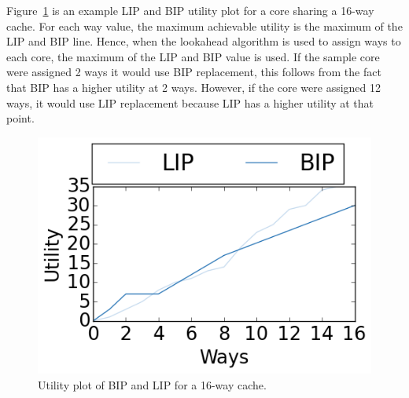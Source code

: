 Figure~\ref{fig:algorithms:clu_example} is an example LIP and BIP utility plot for a core sharing a 16-way cache.
For each way value, the maximum achievable utility is the maximum of the LIP and BIP line.
Hence, when the lookahead algorithm is used to assign ways to each core, the maximum of the LIP and BIP value is used.
If the sample core were assigned 2 ways it would use BIP replacement, this follows from the fact that BIP has a higher utility at 2 ways.
However, if the core were assigned 12 ways, it would use LIP replacement because LIP has a higher utility at that point.

\begin{figure}[ht]
    \centering
    \includegraphics[width=.65\textwidth]{figures/algorithms/clu-utility}
    \caption{Utility plot of BIP and LIP for a 16-way cache.}
    \label{fig:algorithms:clu_example}
\end{figure}
